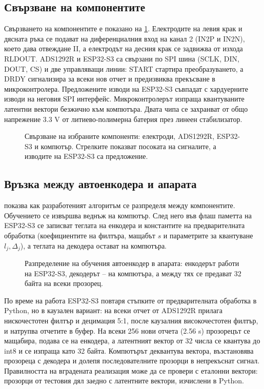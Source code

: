 \documentclass[12pt,a4paper]{article}
\begin{document}
\subsection{Свързване на компонентите}
Свързването на компонентите е показано на \cref{fig:connection}. Електродите на левия крак и дясната ръка се подават на диференциалния вход на канал 2 (IN2P и IN2N), което дава отвеждане II, а електродът на десния крак се задвижва от изхода RLDOUT. ADS1292R и ESP32-S3 са свързани по SPI шина (SCLK, DIN, DOUT, CS) и две управляващи линии: START стартира преобразуването, а DRDY сигнализира за всеки нов отчет и предизвиква прекъсване в микроконтролера. Предложените изводи на ESP32-S3 съвпадат с хардуерните изводи на неговия SPI интерфейс. Микроконтролерът изпраща квантуваните латентни вектори безжично към компютъра. Двата чипа се захранват от общо напрежение 3.3 V от литиево-полимерна батерия през линеен стабилизатор.

\begin{figure}[htbp]
    \centering
    \resizebox{\textwidth}{!}{}
    \caption{Свързване на избраните компоненти: електроди, ADS1292R, ESP32-S3 и компютър. Стрелките показват посоката на сигналите, а изводите на ESP32-S3 са предложение.}
    \label{fig:connection}
\end{figure}

\subsection{Връзка между автоенкодера и апарата}
 показва как разработеният алгоритъм се разпределя между компонентите. Обучението се извършва веднъж на компютър. След него във флаш паметта на ESP32-S3 се записват теглата на енкодера и константите на предварителната обработка (коефициентите на филтъра, мащабът \(s\) и параметрите за квантуване \(l_j, \Delta_j\)), а теглата на декодера остават на компютъра.

\begin{figure}[htbp]
    \centering
    \resizebox{\textwidth}{!}{}
    \caption{Разпределение на обучения автоенкодер в апарата: енкодерът работи на ESP32-S3, декодерът -- на компютъра, а между тях се предават 32 байта на всеки прозорец.}
    \label{fig:system}
\end{figure}

По време на работа ESP32-S3 повтаря стъпките от предварителната обработка в Python, но в каузален вариант: на всеки отчет от ADS1292R прилага нискочестотен филтър и децимация 5:1, после каузалния високочестотен филтър, и натрупва отчетите в буфер. На всеки 256 нови отчета (2.56 s) прозорецът се мащабира, подава се на енкодера, а латентният вектор от 32 числа се квантува до int8 и се изпраща като 32 байта. Компютърът деквантува вектора, възстановява прозореца с декодера и долепя последователните прозорци в непрекъснат сигнал. Правилността на вградената реализация може да се провери с еталонни вектори: прозорци от тестовия дял заедно с латентните вектори, изчислени в Python.
\end{document}
